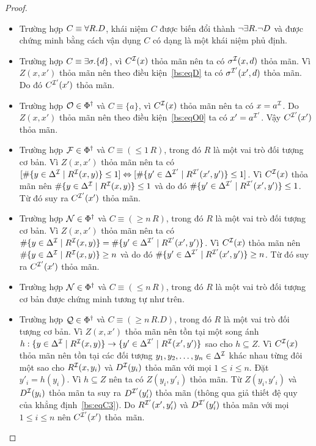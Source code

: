 \begin{proof}
\begin{itemize}
		\item Trường hợp $C \equiv \forall R.D$, khái niệm $C$ được biến đổi thành $\neg \exists R.\neg D$ và được chứng minh bằng cách vận dụng $C$ có dạng là một khái niệm phủ định.
		
		\item Trường hợp $C \equiv \exists \sigma.\{d\}$, vì $C^{\mathcal{I}}(x)$ thỏa mãn nên ta có $\sigma^{\mathcal{I}}(x, d)$ thỏa mãn. Vì $Z(x,x')$ thỏa mãn nên theo điều kiện~\eqref{bs:eqD} ta có $\sigma^{\mathcal{I}'}(x',d)$ thỏa mãn. Do đó $C^{\mathcal{I}'}(x')$ thỏa mãn.
		
		\item Trường hợp $\mathcal{O} \in \Phi^\dag$ và $C \equiv \{a\}$, vì $C^{\mathcal{I}}(x)$ thỏa mãn nên ta có $x=a^{\mathcal{I}}$. Do $Z(x,x')$ thỏa mãn nên theo điều kiện~\eqref{bs:eqO0} ta có $x' = a^{\mathcal{I}'}$. Vậy $C^{\mathcal{I}'}(x')$ thỏa mãn.
		
		\item Trường hợp $\mathcal{F} \in \Phi^\dag$ và $C \equiv (\leq 1\,R)$, trong đó $R$ là một vai trò đối tượng cơ bản. Vì $Z(x,x')$ thỏa mãn nên ta có $[\#\{y \in \Delta^{\mathcal{I}} \mid R^{\mathcal{I}}(x,y)\} \leq 1] \Leftrightarrow [\#\{y' \in \Delta^{\mathcal{I}'} \mid R^{\mathcal{I}'}(x',y')\} \leq 1]$. Vì $C^{\mathcal{I}}(x)$ thỏa mãn nên $\#\{y \in \Delta^{\mathcal{I}} \mid R^{\mathcal{I}}(x,y)\} \leq 1$ và do đó $\#\{y' \in \Delta^{\mathcal{I}'} \mid R^{\mathcal{I}'}(x',y')\} \leq 1$. Từ đó suy ra $C^{\mathcal{I}'}(x')$ thỏa mãn.
		
		\item Trường hợp $\mathcal{N} \in \Phi^\dag$ và $C \equiv (\geq n\,R)$, trong đó $R$ là một vai trò đối tượng cơ bản. Vì $Z(x,x')$ thỏa mãn nên ta có $\#\{y \in \Delta^{\mathcal{I}} \mid R^{\mathcal{I}}(x,y)\} = \#\{y' \in \Delta^{\mathcal{I}'} \mid R^{\mathcal{I}'}(x',y')\}$. Vì $C^{\mathcal{I}}(x)$ thỏa mãn nên $\#\{y \in \Delta^{\mathcal{I}} \mid R^{\mathcal{I}}(x,y)\} \geq n$ và do đó $\#\{y' \in \Delta^{\mathcal{I}'} \mid R^{\mathcal{I}'}(x',y')\} \geq n$. Từ đó suy ra $C^{\mathcal{I}'}(x')$ thỏa mãn.
		
		\item Trường hợp $\mathcal{N} \in \Phi^\dag$ và $C \equiv (\leq n\,R)$, trong đó $R$ là một vai trò đối tượng cơ bản được chứng minh tương tự như trên.
		
		\item Trường hợp $\mathcal{Q} \in \Phi^\dag$ và $C \equiv (\geq n\,R.D)$, trong đó $R$ là một vai trò đối tượng cơ bản. Vì $Z(x,x')$ thỏa mãn nên tồn tại một song ánh $h : \{y \in \Delta^{\mathcal{I}} \mid R^{\mathcal{I}}(x,y)\} \rightarrow \{y' \in \Delta^{\mathcal{I}'} \mid R^{\mathcal{I}}(x',y')\}$ sao cho $h \subseteq Z$. Vì $C^{\mathcal{I}}(x)$ thỏa mãn nên tồn tại các đối tượng $y_1, y_2, \ldots, y_n \in \Delta^{\mathcal{I}}$ khác nhau từng đôi một sao cho $R^{\mathcal{I}}(x, y_i)$ và $D^{\mathcal{I}}(y_i)$ thỏa mãn với mọi $1 \leq i \leq n$. Đặt $y'_i = h(y_i)$. Vì $h \subseteq Z$ nên ta có $Z(y_i, y'_i)$ thỏa mãn. Từ $Z(y_i, y'_i)$ và $D^{\mathcal{I}}(y_i)$ thỏa mãn ta suy ra $D^{\mathcal{I}'}(y'_i)$ thỏa mãn (thông qua giả thiết đệ quy của khẳng định~\eqref{bs:eqC3}). Do $R^{\mathcal{I}'}(x', y'_i)$ và $D^{\mathcal{I}'}(y'_i)$ thỏa mãn với mọi $1 \leq i \leq n$ nên $C^{\mathcal{I}'}(x')$ thỏa~mãn.
		

\end{itemize}
\end{proof}
